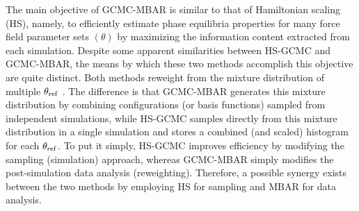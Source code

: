 \documentclass[journal=jced,manuscript=article]{achemso}
\begin{document}



The main objective of GCMC-MBAR is similar to that of Hamiltonian scaling (HS), namely, to efficiently estimate phase equilibria properties for many force field parameter sets $(\theta)$ by maximizing the information content extracted from each simulation. Despite some apparent similarities between HS-GCMC and GCMC-MBAR, the means by which these two methods accomplish this objective are quite distinct. Both methods reweight from the mixture distribution of multiple $\theta_{\rm ref}$ \cite{arxivShirts2017}. The difference is that GCMC-MBAR generates this mixture distribution by combining configurations (or basis functions) sampled from independent simulations, while HS-GCMC samples directly from this mixture distribution in a single simulation and stores a combined (and scaled) histogram for each $\theta_{\rm ref}$. To put it simply, HS-GCMC improves efficiency by modifying the sampling (simulation) approach, whereas GCMC-MBAR simply modifies the post-simulation data analysis (reweighting). Therefore, a possible synergy exists between the two methods by employing HS for sampling and MBAR for data analysis.
\end{document}
